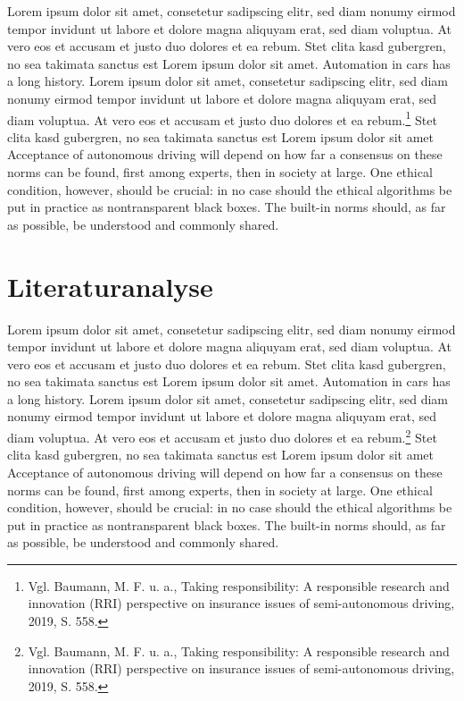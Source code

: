 Lorem ipsum dolor sit amet, consetetur sadipscing elitr, sed diam nonumy eirmod tempor invidunt ut labore et dolore magna aliquyam erat, sed diam voluptua. 
At vero eos et accusam et justo duo dolores et ea rebum. 
Stet clita kasd gubergren, no sea takimata sanctus est Lorem ipsum dolor sit amet. 
Automation in cars has a long history.  Lorem ipsum dolor sit amet, consetetur sadipscing elitr, sed diam nonumy eirmod tempor invidunt ut labore et dolore magna aliquyam erat, sed diam voluptua. 
At vero eos et accusam et justo duo dolores et ea rebum.\footnote{Vgl. Baumann, M. F. u. a., Taking responsibility: A responsible research and innovation (RRI) perspective on insurance issues of semi-autonomous driving, 2019, S. 558.} 
Stet clita kasd gubergren, no sea takimata sanctus est Lorem ipsum dolor sit amet Acceptance of autonomous driving will depend on how far a consensus on these norms can be found, first among experts, then in society at large. 
One ethical condition, however, should be crucial: in no case should the ethical algorithms be put in practice as nontransparent black boxes. 
The built-in norms should, as far as possible, be understood and commonly shared.

\section{Literaturanalyse}

Lorem ipsum dolor sit amet, consetetur sadipscing elitr, sed diam nonumy eirmod tempor invidunt ut labore et dolore magna aliquyam erat, sed diam voluptua. 
At vero eos et accusam et justo duo dolores et ea rebum. 
Stet clita kasd gubergren, no sea takimata sanctus est Lorem ipsum dolor sit amet. 
Automation in cars has a long history.  Lorem ipsum dolor sit amet, consetetur sadipscing elitr, sed diam nonumy eirmod tempor invidunt ut labore et dolore magna aliquyam erat, sed diam voluptua. 
At vero eos et accusam et justo duo dolores et ea rebum.\footnote{Vgl. Baumann, M. F. u. a., Taking responsibility: A responsible research and innovation (RRI) perspective on insurance issues of semi-autonomous driving, 2019, S. 558.} 
Stet clita kasd gubergren, no sea takimata sanctus est Lorem ipsum dolor sit amet Acceptance of autonomous driving will depend on how far a consensus on these norms can be found, first among experts, then in society at large. 
One ethical condition, however, should be crucial: in no case should the ethical algorithms be put in practice as nontransparent black boxes. 
The built-in norms should, as far as possible, be understood and commonly shared.

